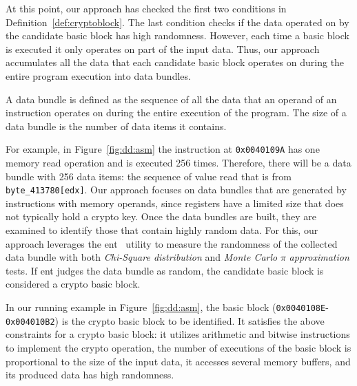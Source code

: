 At this point, our approach has checked the first two conditions  in Definition~\ref{def:cryptoblock}. 
The last condition checks if the data operated on by the candidate basic block has high randomness. 
However, each time a basic block is executed it only operates on part of the input data. 
Thus, our approach accumulates all the data that each candidate basic block operates on during the entire program execution into data bundles.

\begin{Definition}
A data bundle is defined as the sequence of all the data that an operand of an instruction operates on during the entire execution of the program. The size of a data bundle is the number of data items it contains.
\end{Definition}

{For example, in Figure~\ref{fig:dd:asm} the instruction at \texttt{0x0040109A} has one memory read operation and is executed 256 times. Therefore, there will be a data bundle with 256 data items: the sequence of value read that is from \texttt{byte\_413780[edx]}.
%
Our approach focuses on data bundles that are generated by  instructions with memory operands, since registers have a limited size that does not typically hold a crypto key.
Once the data bundles are built, they are examined to identify those that contain highly random data. 
For this, {our approach leverages the \textsf{\small ent}~\cite{ent_random} utility to measure the randomness of the collected data bundle with both \emph{Chi-Square distribution} and \emph{Monte Carlo} $\pi$ \emph{approximation} tests}.
If \textsf{\small ent} judges the data bundle as random, the candidate basic block is considered a crypto basic block.

In our running example in Figure~\ref{fig:dd:asm}, the basic block (\texttt{0x0040108E}-\texttt{0x004010B2}) is the crypto basic block to be identified.
It satisfies the above constraints for a crypto basic block:
	it utilizes arithmetic and bitwise instructions to implement the crypto operation, 
	the number of executions of the basic block is proportional to the size of the input data, 
	it accesses several memory buffers, and its produced data has high randomness.

}
